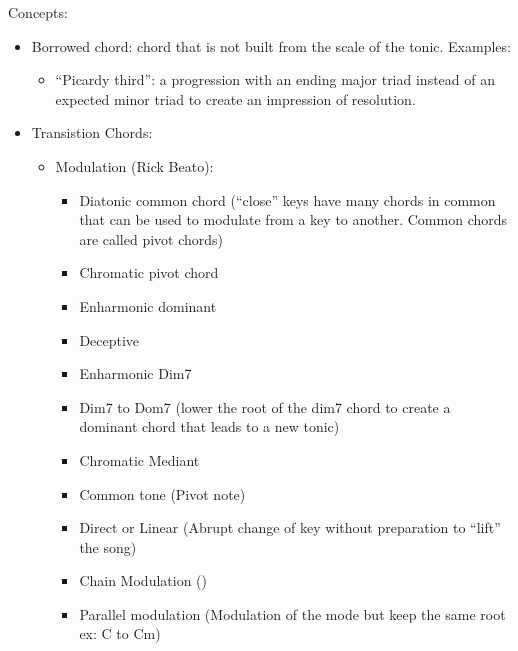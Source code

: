 \documentclass{article}
\begin{document}
Concepts:
\begin{itemize}
	\item Borrowed chord: chord that is not built from the scale of the tonic. Examples:
	\begin{itemize}
		\item ``Picardy third'': a progression with an ending major triad instead of an expected minor triad to create an impression of resolution.
	\end{itemize}
	\item Transistion Chords:
	\begin{itemize}
		\item Modulation (Rick Beato):
		\begin{itemize}
			\item Diatonic common chord (``close'' keys have many chords in common that can be used to modulate from a key to another. Common chords are called pivot chords)
			\item Chromatic pivot chord
			\item Enharmonic dominant
			\item Deceptive
			\item Enharmonic Dim7
			\item Dim7 to Dom7 (lower the root of the dim7 chord to create a dominant chord that leads to a new tonic)
			\item Chromatic Mediant
			\item Common tone (Pivot note)
			\item Direct or Linear (Abrupt change of key without preparation to ``lift'' the song)
			\item Chain Modulation ()
			\item Parallel modulation (Modulation of the mode but keep the same root ex: C to Cm)
		\end{itemize}
	\end{itemize}
\end{itemize}
\end{document}
